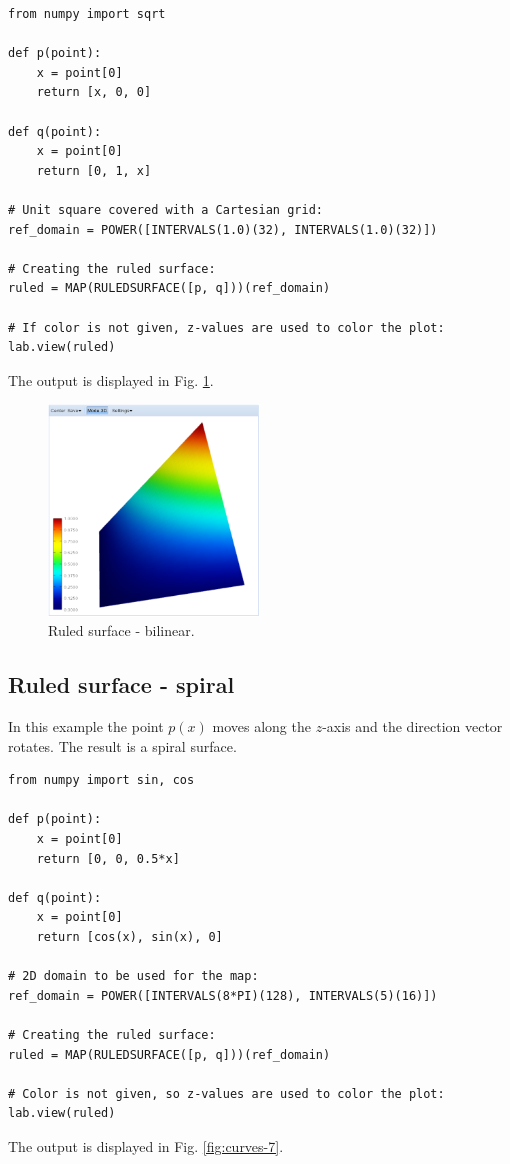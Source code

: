 \documentclass{article}
\begin{document}
\begin{verbatim}
from numpy import sqrt

def p(point):
    x = point[0]
    return [x, 0, 0]
  
def q(point):
    x = point[0]
    return [0, 1, x]

# Unit square covered with a Cartesian grid:  
ref_domain = POWER([INTERVALS(1.0)(32), INTERVALS(1.0)(32)])

# Creating the ruled surface:
ruled = MAP(RULEDSURFACE([p, q]))(ref_domain)

# If color is not given, z-values are used to color the plot:
lab.view(ruled)
\end{verbatim}
The output is displayed in Fig. \ref{fig:curves-6}.

\begin{figure}[!ht]
\begin{center}
\includegraphics[width=0.5\textwidth]{img/curves-6.png}
\end{center}
\vspace{-2mm}
\caption{Ruled surface - bilinear.}
\label{fig:curves-6}
\end{figure}

\subsection{Ruled surface - spiral}

In this example the point $p(x)$ moves along the $z$-axis and 
the direction vector rotates. The result is a spiral surface.

\begin{verbatim}
from numpy import sin, cos

def p(point):
    x = point[0]
    return [0, 0, 0.5*x]
  
def q(point):
    x = point[0]
    return [cos(x), sin(x), 0]

# 2D domain to be used for the map:  
ref_domain = POWER([INTERVALS(8*PI)(128), INTERVALS(5)(16)])

# Creating the ruled surface:
ruled = MAP(RULEDSURFACE([p, q]))(ref_domain)

# Color is not given, so z-values are used to color the plot:
lab.view(ruled)
\end{verbatim}
The output is displayed in Fig. \ref{fig:curves-7}.
\end{document}
